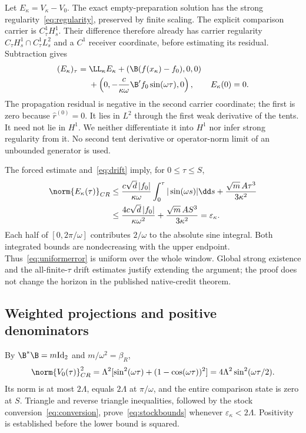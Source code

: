 Let $E_\kappa=V_\kappa-V_0$. The exact empty-preparation solution has the strong regularity~\eqref{eq:regularity}, preserved by finite scaling. The explicit comparison carrier is $C^1_\tau H^1_s$. Their difference therefore already has carrier regularity $C_\tau H^1_s\cap C^1_\tau L^2_s$ and a $C^1$ receiver coordinate, before estimating its residual. Subtraction gives
\begin{equation}\label{eq:error}%
\begin{aligned}
(E_\kappa)_\tau={}&\LL_\kappa E_\kappa
+(\B(f(x_\kappa)-f_0),0,0)\\
&+\left(0,-\frac c{\kappa\omega}\B'f_0\sin(\omega\tau),0\right),
\qquad E_\kappa(0)=0 .
\end{aligned}
\end{equation}
The propagation residual is negative in the second carrier coordinate; the first is zero because $\widehat r^{(0)}=0$. It lies in $L^2$ through the first weak derivative of the tents. It need not lie in $H^1$. We neither differentiate it into $H^1$ nor infer strong regularity from it. No second tent derivative or operator-norm limit of an unbounded generator is used.

The forced estimate and~\eqref{eq:drift} imply, for $0\le\tau\le S$,
\begin{equation}\label{eq:uniformerror}%
\begin{aligned}
\norm{E_\kappa(\tau)}_{CR}
&\le\frac{c\sqrt d\,|f_0|}{\kappa\omega}
\int_0^\tau|\sin(\omega s)|\dd s
+\frac{\sqrt m\,A\tau^3}{3\kappa^2}\\
&\le\frac{4c\sqrt d\,|f_0|}{\kappa\omega^2}
+\frac{\sqrt m\,AS^3}{3\kappa^2}
=\varepsilon_\kappa .
\end{aligned}
\end{equation}
Each half of $[0,2\pi/\omega]$ contributes $2/\omega$ to the absolute sine integral. Both integrated bounds are nondecreasing with the upper endpoint. Thus~\eqref{eq:uniformerror} is uniform over the whole window. Global strong existence and the all-finite-$\tau$ drift estimates justify extending the argument; the proof does not change the horizon in the published native-credit theorem.

\subsection{Weighted projections and positive denominators}
By $\B^*\B=m\mathrm{Id}_2$ and $m/\omega^2=\beta_R$,
\begin{equation}\label{eq:comparisonnorm}%
\norm{V_0(\tau)}_{CR}^2
=\Lambda^2[\sin^2(\omega\tau)+(1-\cos(\omega\tau))^2]
=4\Lambda^2\sin^2(\omega\tau/2).
\end{equation}
Its norm is at most $2\Lambda$, equals $2\Lambda$ at $\pi/\omega$, and the entire comparison state is zero at $S$. Triangle and reverse triangle inequalities, followed by the stock conversion~\eqref{eq:conversion}, prove~\eqref{eq:stockbounds} whenever $\varepsilon_\kappa<2\Lambda$. Positivity is established before the lower bound is squared.

